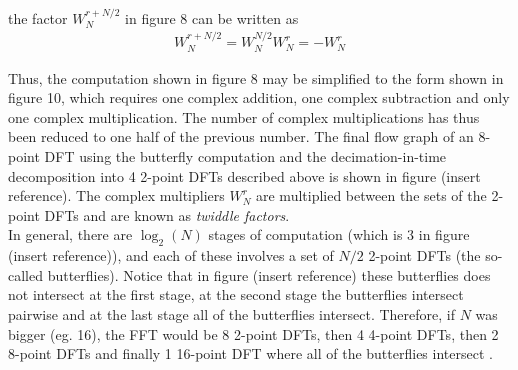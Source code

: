 the factor $W_N^{r+N/2}$ in figure 8 can be written as
\begin{align*}
W_N^{r+N/2} = W_N^{N/2} W_N^r = -W_N^r
\end{align*}

Thus, the computation shown in figure 8 may be simplified to the form shown in figure 10, which requires one complex addition, one complex subtraction and only one complex multiplication. The number of complex multiplications has thus been reduced to one half of the previous number. The final flow graph of an 8-point DFT using the butterfly computation and the decimation-in-time decomposition into 4 2-point DFTs described above is shown in figure (insert reference). The complex multipliers $W_N^r$ are multiplied between the sets of the 2-point DFTs and are known as \textit{twiddle factors}.
\\
In general, there are $\log_2(N)$ stages of computation (which is 3 in figure (insert reference)), and each of these involves a set of $N/2$ 2-point DFTs (the so-called butterflies). Notice that in figure (insert reference) these butterflies does not intersect at the first stage, at the second stage the butterflies intersect pairwise and at the last stage all of the butterflies intersect. Therefore, if $N$ was bigger (eg. 16), the FFT would be 8 2-point DFTs, then 4 4-point DFTs, then 2 8-point DFTs and finally 1 16-point DFT where all of the butterflies intersect .